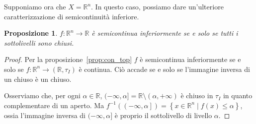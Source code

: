 \documentclass[a4paper, 11pt]{article}
\newcommand{\R}{\mathbb{R}}
\theoremstyle{plain} 	%
\newtheorem{proposizione}{Proposizione}
\theoremstyle{definition}
\theoremstyle{remark}
\begin{document}
    Supponiamo ora che $X=\R^{n}$. In questo caso, possiamo dare un'ulteriore caratterizzazione di semicontinuità inferiore.
    \begin{proposizione}
        $f\colon\R^{n}\to\R$ è semicontinua inferiormente se e solo se tutti i sottolivelli sono chiusi.
    \end{proposizione}
    \begin{proof}
        Per la proposizione~\ref{prop:con_top} $f$ è semicontinua inferiormente se e solo se $f\colon\R^n\to\left(\R,\tau_I\right)$ è continua. Ciò accade se e solo se l'immagine inversa di un chiuso è un chiuso.

        Osserviamo che, per ogni $\alpha\in\R$, $(-\infty,\alpha]=\R\setminus\left(\alpha,+\infty\right)$ è chiuso in $\tau_I$ in quanto complementare di un aperto. Ma $f^{-1}\left(\left(-\infty,\alpha\right]\right)=\left\{x\in\R^n\mid f(x)\le\alpha\right\}$, ossia l'immagine inversa di $(-\infty,\alpha]$ è proprio il sottolivello di livello $\alpha$.
    \end{proof}
\end{document}
